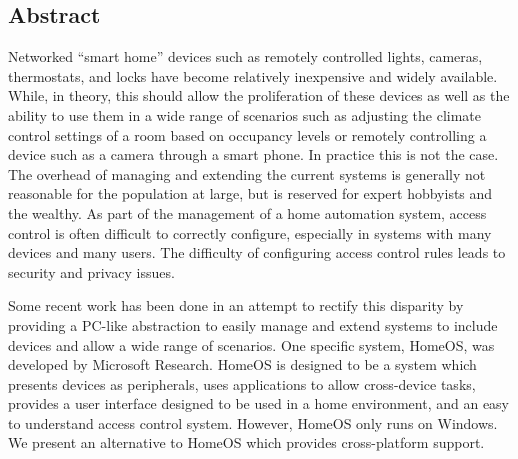 \subsection*{Abstract}
Networked ``smart home'' devices such as remotely controlled lights, cameras,
thermostats, and locks have become relatively inexpensive and widely available.
While, in theory, this should allow the proliferation of these devices as well
as the ability to use them in a wide range of scenarios such as adjusting the
climate control settings of a room based on occupancy levels or remotely
controlling a device such as a camera through a smart phone. In practice this is
not the case. The overhead of managing and extending the current systems is
generally not reasonable for the population at large, but is reserved for
expert hobbyists and the wealthy. As part of the management of a home automation
system, access control is often difficult to correctly configure, especially in
systems with many devices and many users. The difficulty of configuring access
control rules leads to security and privacy issues.

Some recent work has been done in an attempt to rectify this disparity by
providing a PC-like abstraction to easily manage and extend systems to include
devices and allow a wide range of scenarios. One specific system, HomeOS, was
developed by Microsoft Research. HomeOS is designed to be a system which
presents devices as peripherals, uses applications to allow cross-device tasks,
provides a user interface designed to be used in a home environment, and an easy
to understand access control system. However, HomeOS only runs on Windows.  We
present an alternative to HomeOS which provides cross-platform support.